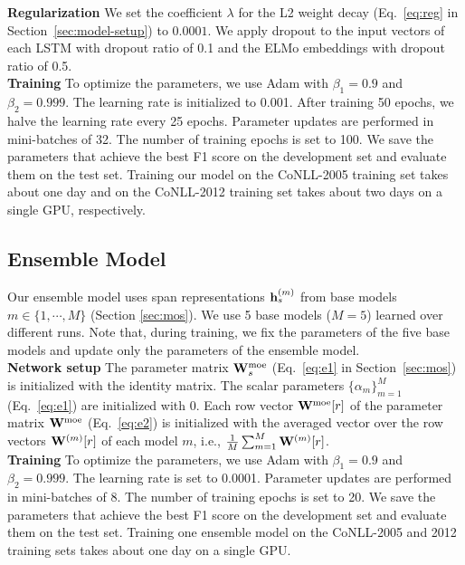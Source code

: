 \documentclass[11pt,a4paper]{article}
\begin{document}
\noindent
{\bf Regularization}\hspace{0.2cm} We set the coefficient $\lambda$ for the L2 weight decay (Eq.~\ref{eq:reg} in Section~\ref{sec:model-setup}) to $0.0001$.
We apply dropout \cite{srivastava:14} to the input vectors of each LSTM with dropout ratio of 0.1 and the ELMo embeddings with dropout ratio of 0.5.\\

\noindent
{\bf Training} \hspace{0.2cm} To optimize the parameters, we use Adam \cite{kingma:14} with $\beta_1 = 0.9$ and $\beta_2 = 0.999$.
The learning rate is initialized to 0.001.
After training 50 epochs, we halve the learning rate every 25 epochs.
Parameter updates are performed in mini-batches of 32.
The number of training epochs is set to 100.
We save the parameters that achieve the best F1 score on the development set and evaluate them on the test set.
Training our model on the CoNLL-2005 training set takes about one day and on the CoNLL-2012 training set takes about two days on a single GPU, respectively.

\subsection{\bf Ensemble Model}
Our ensemble model uses span representations ${\bf h}^{(m)}_s$ from base models $m \in \{1, \cdots, M \}$ (Section \ref{sec:mos}).
We use 5 base models ($M = 5$) learned over different runs.
Note that, during training, we fix the parameters of the five base models and update only the parameters of the ensemble model.\\

\noindent
{\bf Network setup} \hspace{0.2cm} The parameter matrix ${\bf W}^\text{moe}_s$ (Eq.~\ref{eq:e1} in Section~\ref{sec:mos}) is initialized with the identity matrix.
The scalar parameters $\{ \alpha_m \}^M_{m=1}$ (Eq.~\ref{eq:e1}) are initialized with $0$.
Each row vector ${\bf W}^\text{moe}[r]$ of the parameter matrix ${\bf W}^\text{moe}$  (Eq.~\ref{eq:e2}) is initialized with the averaged vector over the row vectors ${\bf W}^{(m)}[r]$ of each model $m$, i.e., $\frac{1}{M} \sum_{m=1}^M {\bf W}^{(m)}[r]$.
\\

\noindent
{\bf Training} \hspace{0.2cm} To optimize the parameters, we use Adam with $\beta_1 = 0.9$ and $\beta_2 = 0.999$.
The learning rate is set to 0.0001.
Parameter updates are performed in mini-batches of 8.
The number of training epochs is set to 20.
We save the parameters that achieve the best F1 score on the development set and evaluate them on the test set.
Training one ensemble model on the CoNLL-2005 and 2012 training sets takes about one day on a single GPU.
\end{document}
